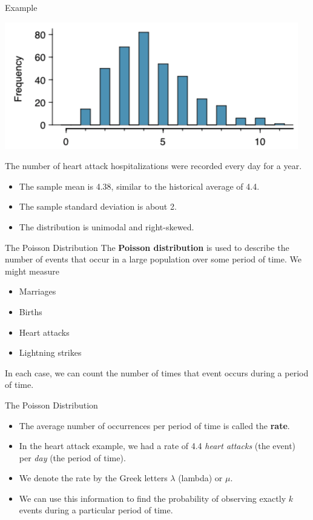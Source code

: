 \begin{frame}{Example}
    \begin{center}
        \includegraphics[scale=.4]{images/poisson1.png}
    \end{center}
    \vspace{-10pt}The number of heart attack hospitalizations were recorded every day for a year.
    \begin{itemize}
        \item The sample mean is 4.38, similar to the historical average of 4.4.
        \item The sample standard deviation is about 2.
        \item The distribution is unimodal and right-skewed.
    \end{itemize}
\end{frame}

\begin{frame}{The Poisson Distribution}
    The \textbf{Poisson distribution} is used to describe the number of events that occur in a large population over some period of time. We might measure
    \begin{itemize}
        \item Marriages
        \item Births
        \item Heart attacks
        \item Lightning strikes
    \end{itemize}
    In each case, we can count the number of times that event occurs during a period of time. 
\end{frame}

\begin{frame}{The Poisson Distribution}
    \begin{itemize}
        \item The average number of occurrences per period of time is called the \textbf{rate}.
        \item In the heart attack example, we had a rate of 4.4 \textit{heart attacks} (the event) per \textit{day} (the period of time).
        \item We denote the rate by the Greek letters $\lambda$ (lambda) or $\mu$.
        \item We can use this information to find the probability of observing exactly $k$ events during a particular period of time.
    \end{itemize}
\end{frame}

